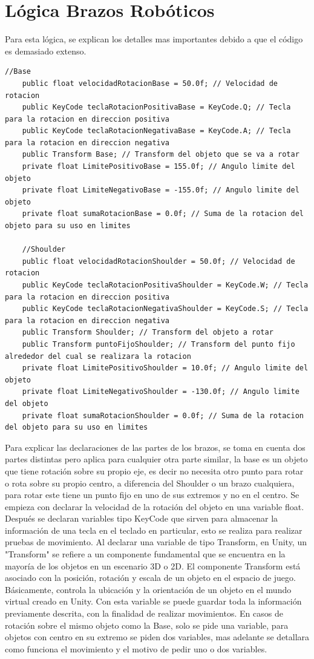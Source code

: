 \section{Lógica Brazos Robóticos}
Para esta lógica, se explican los detalles mas importantes debido a que el código es demasiado extenso.
\begin{lstlisting}[frame=single]
   //Base
    public float velocidadRotacionBase = 50.0f; // Velocidad de rotacion
    public KeyCode teclaRotacionPositivaBase = KeyCode.Q; // Tecla para la rotacion en direccion positiva
    public KeyCode teclaRotacionNegativaBase = KeyCode.A; // Tecla para la rotacion en direccion negativa
    public Transform Base; // Transform del objeto que se va a rotar
    private float LimitePositivoBase = 155.0f; // Angulo limite del objeto
    private float LimiteNegativoBase = -155.0f; // Angulo limite del objeto
    private float sumaRotacionBase = 0.0f; // Suma de la rotacion del objeto para su uso en limites

    //Shoulder
    public float velocidadRotacionShoulder = 50.0f; // Velocidad de rotacion
    public KeyCode teclaRotacionPositivaShoulder = KeyCode.W; // Tecla para la rotacion en direccion positiva
    public KeyCode teclaRotacionNegativaShoulder = KeyCode.S; // Tecla para la rotacion en direccion negativa
    public Transform Shoulder; // Transform del objeto a rotar
    public Transform puntoFijoShoulder; // Transform del punto fijo alrededor del cual se realizara la rotacion
    private float LimitePositivoShoulder = 10.0f; // Angulo limite del objeto
    private float LimiteNegativoShoulder = -130.0f; // Angulo limite del objeto
    private float sumaRotacionShoulder = 0.0f; // Suma de la rotacion del objeto para su uso en limites
\end{lstlisting}
Para explicar las declaraciones de las partes de los brazos, se toma en cuenta dos partes distintas pero aplica para cualquier otra parte similar, la base es un objeto que tiene rotación sobre su propio eje, es decir no necesita otro punto para rotar o rota sobre su propio centro, a diferencia del Shoulder o un brazo cualquiera, para rotar este tiene un punto fijo en uno de sus extremos y no en el centro.
Se empieza con declarar la velocidad de la rotación del objeto en una variable float. Después se declaran variables tipo KeyCode que sirven para almacenar la información de una tecla en el teclado en particular, esto se realiza para realizar pruebas de movimiento.
Al declarar una variable de tipo Transform, en Unity, un "Transform" se refiere a un componente fundamental que se encuentra en la mayoría de los objetos en un escenario 3D o 2D. El componente Transform está asociado con la posición, rotación y escala de un objeto en el espacio de juego. Básicamente, controla la ubicación y la orientación de un objeto en el mundo virtual creado en Unity. Con esta variable se puede guardar toda la información previamente descrita, con la finalidad de realizar movimientos. En casos de rotación sobre el mismo objeto como la Base, solo se pide una variable, para objetos con centro en su extremo se piden dos variables, mas adelante se detallara como funciona el movimiento y el motivo de pedir uno o dos variables.
